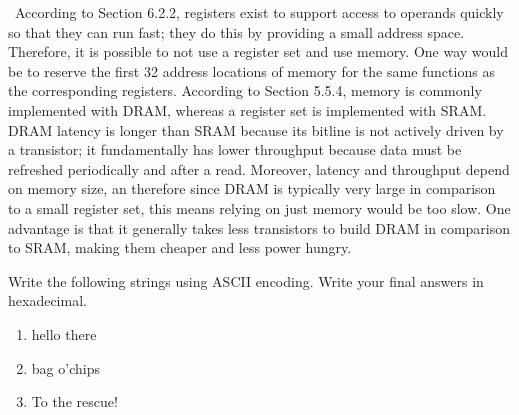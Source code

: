 \documentclass[12pt]{article}
\newenvironment{ex}[2][Exercise]{\begin{trivlist}
		\item[\hskip \labelsep {\bfseries #1}\hskip \labelsep {\bfseries #2.}]}{\end{trivlist}}
\newenvironment{sol}[1][Solution]{\begin{trivlist}
		\item[\hskip \labelsep {\bfseries #1:}]}{\end{trivlist}}
\begin{document}
\begin{sol}
	\
	According to Section 6.2.2, registers exist to support access to operands quickly so that
	they can run fast; they do this by providing a small address space. Therefore, it is possible
	to not use a register set and use memory. One way would be to reserve the first 32 address
	locations of memory for the same functions as the corresponding registers.
	According to Section 5.5.4, memory is commonly implemented with DRAM, whereas a register set is
	implemented with SRAM. DRAM latency is longer than SRAM because its bitline is  not actively
	driven by a transistor; it fundamentally has lower throughput because data must be refreshed
	periodically and after a read. Moreover, latency and throughput depend on memory size, an
	therefore since DRAM is typically very large in comparison to a small register set, this means
	relying on just memory would be too slow. One advantage is that it generally takes less
	transistors to build DRAM in comparison to SRAM, making them cheaper and less power hungry.
\end{sol}

\begin{ex}{6.3}
	Write the following strings using ASCII encoding. Write your final answers in hexadecimal.
	\begin{enumerate}[label=(\alph*)]
		\item hello there
		\item bag o'chips
		\item To the rescue!
	\end{enumerate}
\end{ex}
\end{document}
